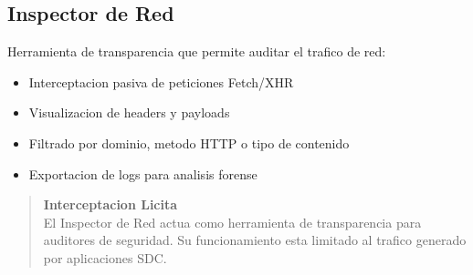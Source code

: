 \subsection{Inspector de Red}

Herramienta de transparencia que permite auditar el trafico de red:

\begin{itemize}[leftmargin=*]
    \item Interceptacion pasiva de peticiones Fetch/XHR
    \item Visualizacion de headers y payloads
    \item Filtrado por dominio, metodo HTTP o tipo de contenido
    \item Exportacion de logs para analisis forense
\end{itemize}

\begin{quote}
\textbf{Interceptacion Licita}\\
El Inspector de Red actua como herramienta de transparencia para auditores de seguridad. Su funcionamiento esta limitado al trafico generado por aplicaciones SDC.
\end{quote}
